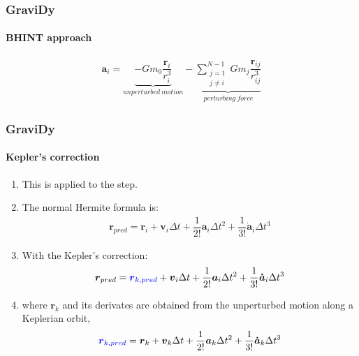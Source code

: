 \begin{frame}
    \frametitle{GraviDy}
    \framesubtitle{BHINT approach}
    \begin{eqnarray}
        \boldsymbol{a}_{i} =   \underbrace{ - G m_{0}
                                          \dfrac{\boldsymbol{r}_{i}}{r_{i}^{3}}
                                          }_{unperturbed\ motion}
                             - \underbrace{ \sum\limits_{\substack{j=1\\j\neq i}}^{N-1}
                                            G m_{j} \dfrac{\boldsymbol{r}_{ij}}{r_{ij}^{3}}
                                          }_{perturbing\ force}
    \end{eqnarray}
\end{frame}

\begin{frame}
    \frametitle{GraviDy}
    \framesubtitle{Kepler's correction}
    \begin{enumerate}
        \item This is applied to the  step.
        \item The normal Hermite formula is:
        \begin{eqnarray}
            \boldsymbol{r}_{pred} =    \boldsymbol{      r}_{i}              +
                                       \boldsymbol{      v}_{i} \Delta t     +
                         \dfrac{1}{2!} \boldsymbol{      a}_{i} \Delta t^{2} +
                         \dfrac{1}{3!} \boldsymbol{\dot{a}}_{i} \Delta t^{3}
        \end{eqnarray}
        \item With the Kepler's correction:
        \begin{eqnarray}
            \boldsymbol{r}_{pred} =    \textcolor{blue}{\boldsymbol{      r}_{k,pred}}         +
                                             \boldsymbol{      v}_{i} \Delta t     +
                         \dfrac{1}{2!}       \boldsymbol{      a}_{i} \Delta t^{2} +
                         \dfrac{1}{3!}       \boldsymbol{\dot{a}}_{i} \Delta t^{3}
        \end{eqnarray}
        \item where $\boldsymbol{r}_{k}$ and its derivates 
            are obtained from the unperturbed motion along a Keplerian orbit,
        \begin{eqnarray}
            \textcolor{blue}{\boldsymbol{r}_{k,pred}} =  \boldsymbol{      r}_{k}              +
                                       \boldsymbol{      v}_{k} \Delta t     +
                         \dfrac{1}{2!} \boldsymbol{      a}_{k} \Delta t^{2} +
                         \dfrac{1}{3!} \boldsymbol{\dot{a}}_{k} \Delta t^{3}
        \end{eqnarray}

    \end{enumerate}
\end{frame}

